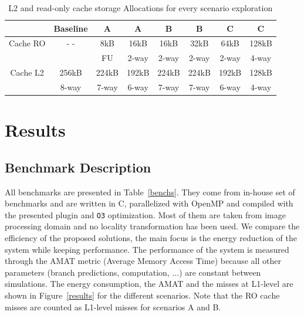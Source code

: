 \documentclass[sigconf]{acmart}
\begin{document}
\begin{table}
\caption{L2 and read-only cache storage Allocations for every scenario exploration}
\label{sizesCaches}
\begin{tabular}{ |c|c|c|c|c|c|c|c| }
\hline
\hline
 &Baseline   & A & A & B & B & C & C\\
\hline
 Cache RO & - -  & 8kB & 16kB & 16kB & 32kB & 64kB & 128kB\\
      &  & FU & 2-way &  2-way & 2-way & 2-way &  4-way \\
\hline
 Cache L2 &  256kB & 224kB & 192kB & 224kB & 224kB & 192kB & 128kB \\
  &  8-way & 7-way & 6-way  & 7-way  & 7-way & 6-way & 4-way \\
\hline
\hline
\end{tabular}
\end{table}

\section{Results}

\subsection{Benchmark Description}

All benchmarks are presented in Table~\ref{benchs}. They come from in-house set of benchmarks and are written in C, parallelized with OpenMP and compiled with the presented plugin and \texttt{O3} optimization. Most of them are taken from image processing domain and no locality transformation has been used. We compare the efficiency of the proposed solutions, the main focus is the energy reduction of the system while keeping performance. The performance of the system is measured through the AMAT metric (Average Memory Access Time) because all other parameters (branch predictions, computation, ...) are constant between simulations. The energy consumption, the AMAT and the misses at L1-level are shown in Figure~\ref{results} for the different scenarios. Note that the RO cache misses are counted as L1-level misses for scenarios A and B.
\end{document}
